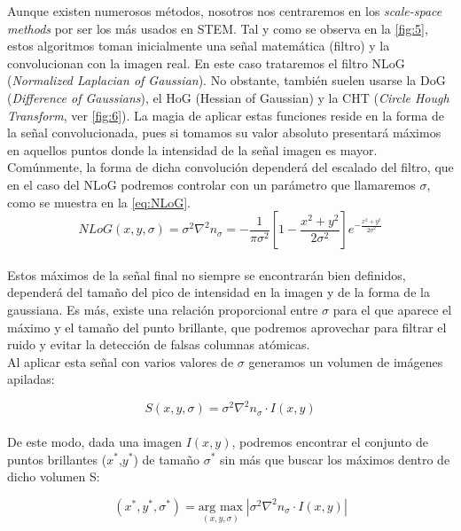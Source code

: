 Aunque existen numerosos métodos, nosotros nos centraremos en los \textit{scale-space methods} por ser los más usados en STEM. Tal y como se observa en la \autoref{fig:5}, estos algoritmos toman inicialmente una señal matemática (filtro) y la convolucionan con la imagen real. En este caso trataremos el filtro NLoG (\textit{Normalized Laplacian of Gaussian}). No obstante, también suelen usarse la DoG (\textit{Difference of Gaussians}), el HoG (Hessian of Gaussian) y la CHT (\textit{Circle Hough Transform}, ver \autoref{fig:6}). La magia de aplicar estas funciones reside en la forma de la señal convolucionada, pues si tomamos su valor absoluto presentará máximos en aquellos puntos donde la intensidad de la señal imagen es mayor. Comúnmente, la forma de dicha convolución dependerá del escalado del filtro, que en el caso del NLoG podremos controlar con un parámetro que llamaremos $\sigma$, como se muestra en la \autoref{eq:NLoG}.\\

\begin{equation} \label{eq:NLoG}
    NLoG(x,y,\sigma) = \sigma^2\nabla^2 n_\sigma =  - \frac{1}{\pi\sigma^2}\left[1 - \frac{x^2 + y^2}{2\sigma^2}\right]e^{-\frac{x^2 + y^2}{2\sigma^2}}
\end{equation}\\

Estos máximos de la señal final no siempre se encontrarán bien definidos, dependerá del tamaño del pico de intensidad en la imagen y de la forma de la gaussiana. Es más, existe una relación proporcional entre $\sigma$ para el que aparece el máximo y el tamaño del punto brillante, que podremos aprovechar para filtrar el ruido y evitar la detección de falsas columnas atómicas.\\

Al aplicar esta señal con varios valores de $\sigma$ generamos un volumen de imágenes apiladas:

\begin{equation}
    S(x,y,\sigma) = \sigma^2\nabla^2 n_\sigma \cdot I(x,y)
\end{equation}\\

De este modo, dada una imagen $I(x,y)$, podremos encontrar el conjunto de puntos brillantes ($x^*$,$y^*$) de tamaño $\sigma^*$ sin más que buscar los máximos dentro de dicho volumen S:

\begin{equation}
    (x^*,y^*,\sigma^*) = \underset{(x,y,\sigma)}{\text{arg max}} \; |\sigma^2 \nabla^2 n_\sigma \cdot I(x,y)|
\end{equation}\\


